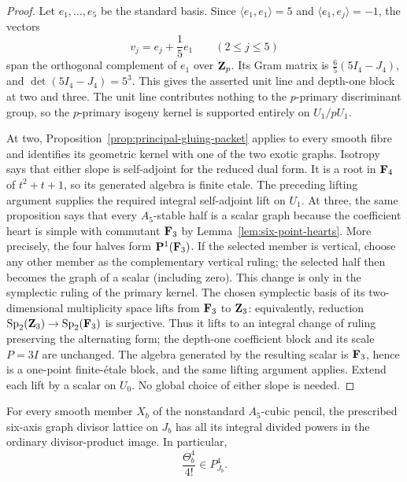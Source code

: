 \begin{proof}
Let \(e_1,\ldots,e_5\) be the standard basis.  Since
\(\langle e_1,e_1\rangle=5\) and \(\langle e_1,e_j\rangle=-1\), the vectors
\[
 v_j=e_j+\frac15e_1\qquad(2\leq j\leq5)
\]
span the orthogonal complement of \(e_1\) over \(\mathbf Z_p\).  Its Gram matrix is
\(\frac65(5I_4-J_4)\), and \(\det(5I_4-J_4)=5^3\).  This gives the asserted
unit line and depth-one block at two and three.  The unit line contributes
nothing to the \(p\)-primary discriminant group, so the \(p\)-primary
isogeny kernel is supported entirely on \(U_1/pU_1\).

At two, Proposition~\ref{prop:principal-gluing-packet} applies to every
smooth fibre and identifies its geometric kernel with one of the two exotic
graphs.  Isotropy says that either slope is self-adjoint for the reduced dual
form.  It is a root in \(\mathbf F_4\) of \(t^2+t+1\), so its generated algebra is
finite etale.  The preceding lifting argument supplies the required integral
self-adjoint lift on \(U_1\).  At three, the same
proposition says that every \(A_5\)-stable half is a scalar graph because the
coefficient heart is simple with commutant \(\mathbf F_3\) by
Lemma~\ref{lem:six-point-hearts}.  More precisely, the
four halves form \(\mathbf P^1(\mathbf F_3)\).  If the selected member is vertical,
choose any other member as the complementary vertical ruling; the selected
half then becomes the graph of a scalar (including zero).  This change is
only in the symplectic ruling of the primary kernel.  The chosen symplectic
basis of its two-dimensional multiplicity space lifts from \(\mathbf F_3\) to
\(\mathbf Z_3\): equivalently, reduction
\(\operatorname{Sp}_2(\mathbf Z_3)\to\operatorname{Sp}_2(\mathbf F_3)\) is surjective.
Thus it lifts to an integral change of ruling preserving the alternating
form; the depth-one coefficient block and its scale \(P=3I\) are unchanged.
The algebra generated by the resulting scalar is
\(\mathbf F_3\), hence is a one-point finite-\'etale block, and the same lifting
argument applies.  Extend each lift by a scalar on \(U_0\).
No global choice of either slope is needed.
\end{proof}

\begin{theorem}
\label{thm:six-axis-divided-powers}
%
%
For every smooth member \(X_b\) of the nonstandard \(A_5\)-cubic pencil, the
prescribed six-axis graph divisor lattice on \(J_b\) has all its integral
divided powers in the ordinary divisor-product image.  In particular,
\[
 \frac{\Theta_b^4}{4!}\in P_{J_b}^4.
 \tag{3.12}
 \label{eq:six-axis-minimal-class}
\]
\end{theorem}

